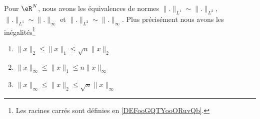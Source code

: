 \begin{proposition} \label{PropLJEJooMOWPNi}
    Pour \( \eR^N\), nous avons les équivalences de normes $\| . \|_{L^1}\sim\| . \|_{L^2}$, $\| . \|_{L^1}\sim\| . \|_{\infty}$ et $\| . \|_{L^2}\sim\| . \|_{\infty}$. Plus précisément nous avons les inégalités\footnote{Les racines carrés sont définies en \ref{DEFooGQTYooORuvQb}.}
    \begin{enumerate}
        \item\label{ItemABSGooQODmLNi}
           $ \| x \|_2\leq \| x \|_1\leq\sqrt{n}\| x \|_2$
        \item\label{ItemABSGooQODmLNii}
            $\| x \|_{\infty}\leq \| x \|_1\leq n \| x \|_{\infty}$
        \item\label{ItemABSGooQODmLNiii}
            $\| x \|_{\infty}\leq \| x \|_2\leq \sqrt{n}\| x \|_{\infty}$
    \end{enumerate}
\end{proposition}

